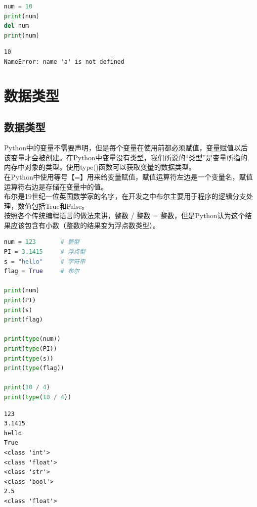 
\begin{lstlisting}[language=Python]
num = 10
print(num)
del num
print(num)
\end{lstlisting}

\begin{tcolorbox}
	\begin{verbatim}
10
NameError: name 'a' is not defined
	\end{verbatim}
\end{tcolorbox}

\newpage

\section{数据类型}

\subsection{数据类型}

Python中的变量不需要声明，但是每个变量在使用前都必须赋值，变量赋值以后该变量才会被创建。在Python中变量没有类型，我们所说的“类型”是变量所指的内存中对象的类型。使用type()函数可以获取变量的数据类型。 \\

在Python中使用等号【=】用来给变量赋值，赋值运算符左边是一个变量名，赋值运算符右边是存储在变量中的值。 \\

布尔是19世纪一位英国数学家的名字，在开发之中布尔主要用于程序的逻辑分支处理，数值包括True和False。 \\

按照各个传统编程语言的做法来讲，整数 / 整数 = 整数，但是Python认为这个结果应该包含有小数（整数的结果变为浮点数类型）。 \\


\begin{lstlisting}[language=Python]
num = 123		# 整型
PI = 3.1415		# 浮点型
s = "hello"		# 字符串
flag = True		# 布尔

print(num)
print(PI)
print(s)
print(flag)

print(type(num))
print(type(PI))
print(type(s))
print(type(flag))

print(10 / 4)
print(type(10 / 4))
\end{lstlisting}

\begin{tcolorbox}
	\begin{verbatim}
123
3.1415
hello
True
<class 'int'>
<class 'float'>
<class 'str'>
<class 'bool'>
2.5
<class 'float'>
	\end{verbatim}
\end{tcolorbox}

